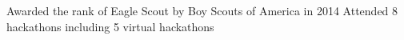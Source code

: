 \resumeItemListStart
\resumeItem
{Awarded the rank of Eagle Scout by Boy Scouts of America in 2014}
\resumeItem
{Attended 8 hackathons including 5 virtual hackathons}
\resumeItemListEnd
